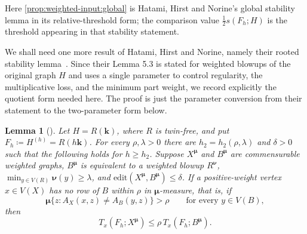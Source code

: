 \documentclass[10pt]{article}
\theoremstyle{plain}
\newtheorem{lemma}[lemma]{Lemma}
\theoremstyle{remark}
\newcommand{\bmu}{{\boldsymbol{\mu}}}
\newcommand{\bnu}{{\boldsymbol{\nu}}}
\begin{document}
Here \cref{prop:weighted-input:global} is Hatami, Hirst and Norine's global stability lemma in its relative-threshold form; the comparison value $\frac12 s(F_h;H)$ is the threshold appearing in that stability statement.

We shall need one more result of Hatami, Hirst and Norine, namely their rooted stability lemma~\cite[Lemma~5.3]{HatamiHirstNorine}. Since their Lemma 5.3 is stated for weighted blowups of the original graph $H$ and uses a single parameter to control regularity, the multiplicative loss, and the minimum part weight, we record explicitly the quotient form needed here. The proof is just the parameter conversion from their statement to the two-parameter form below.

\begin{lemma}[{\cite[Lemma~5.3]{HatamiHirstNorine}}]
\label{lem:weighted-rooted}
Let $H=R(\mathbf k)$, where $R$ is twin-free, and put $F_h\coloneqq H^{(h)}=R(h\mathbf k)$. For every $\rho,\lambda>0$ there are $h_2=h_2(\rho,\lambda)$ and $\delta>0$ such that the following holds for $h\ge h_2$. Suppose $X^\bmu$ and $B^\bmu$ are commensurable weighted graphs, $B^\bmu$ is equivalent to a weighted blowup $R^\bnu$, $\min_{y\in V(R)}\bnu(y)\ge\lambda$, and $\mathrm{edit}(X^\bmu,B^\bmu)\le\delta$. If a positive-weight vertex $x\in V(X)$ has no row of $B$ within $\rho$ in $\bmu$-measure, that is, if
\[
        \bmu\{z:A_X(x,z)\ne A_B(y,z)\}>\rho
        \qquad\text{for every }y\in V(B),
\]
then
\[
        T_x(F_h;X^\bmu)\le \rho\,T_x(F_h;B^\bmu).
\]
\end{lemma}
\end{document}
